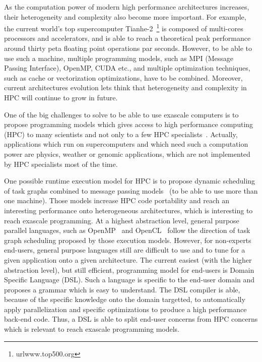 As the computation power of modern high performance architectures increases, their heterogeneity and complexity also become more important. For example, the current world's top supercomputer Tianhe-2~\footnote{url{www.top500.org}} is composed of multi-cores processors and accelerators, and is able to reach a theoretical peak performance around thirty peta floating point operations par seconds. However, to be able to use such a machine, multiple programming models, such as MPI (Message Passing Interface), OpenMP, CUDA etc., and multiple optimization techniques, such as cache or vectorization optimizations, have to be combined. Moreover, current architectures evolution lets think that heterogeneity and complexity in HPC will continue to grow in future.

One of the big challenges to solve to be able to use exascale computers is to propose programming models which gives access to high performance computing (HPC) to many scientists and not only to a few HPC specialists~\cite{ETP4HPC2013}. Actually, applications which run on supercomputers and which need such a computation power are physics, weather or genomic applications, which are not implemented by HPC specialists most of the time.

One possible runtime execution model for HPC is to propose dynamic scheduling of task graphs combined to message passing models~\cite{Gautier:2013:XRS:2510661.2511383,Augonnet2011,wu:hal-01078359} (to be able to use more than one machine). Those models increase HPC code portability and reach an interesting performance onto heterogeneous architectures, which is interesting to reach exascale programming. At a highest abstraction level, general purpose parallel languages, such as OpenMP~\cite{660313} and OpenCL~\cite{Stone:2010:OPP:622179.1803953} follow the direction of task graph scheduling proposed by those execution models. However, for non-experts end-users, general purpose languages still are difficult to use and to tune for a given application onto a given architecture. The current easiest (with the higher abstraction level), but still efficient, programming model for end-users is Domain Specific Language (DSL). Such a language is specific to the end-user domain and proposes a grammar which is easy to understand. The DSL compiler is able, because of the specific knowledge onto the domain targetted, to automatically apply parallelization and specific optimizations to produce a high performance back-end code. Thus, a DSL is able to split end-user concerns from HPC concerns which is relevant to reach exascale programming models.

